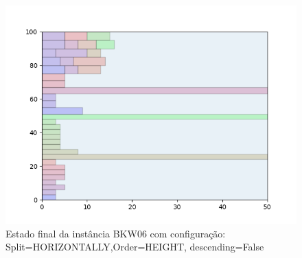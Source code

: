\begin{figure}[H]
    \centering
    \caption[]{Estado final da instância BKW06 com configuração: Split=HORIZONTALLY,Order=HEIGHT, descending=False}
    \label{fig:bkw06-horizontally-height-false}
    \includegraphics[scale=0.5]{output/figures/bkw/bkw06/horizontally/height/false/00}
\end{figure}